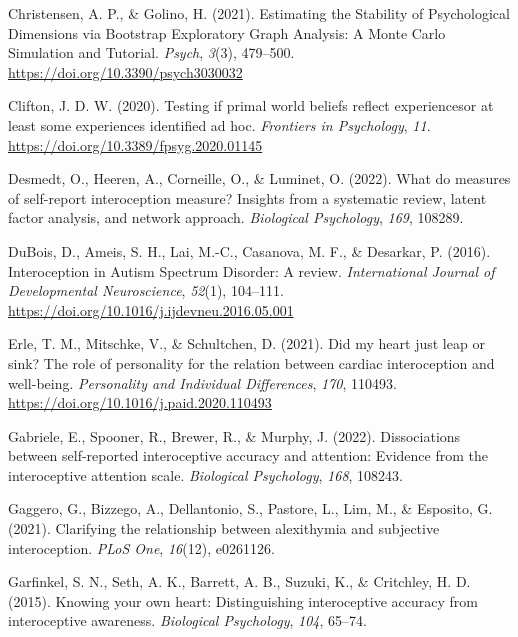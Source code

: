 \documentclass[
  man,
  floatsintext,
  longtable,
  nolmodern,
  notxfonts,
  notimes,
  colorlinks=true,linkcolor=blue,citecolor=blue,urlcolor=blue]{apa7}
\newlength{\cslhangindent}
\newenvironment{CSLReferences}[2] %
 {\begin{list}{}{%
  \setlength{\itemindent}{0pt}
  \setlength{\leftmargin}{0pt}
  \setlength{\parsep}{0pt}
  \ifodd #1
   \setlength{\leftmargin}{\cslhangindent}
   \setlength{\itemindent}{-1\cslhangindent}
  \fi
  \setlength{\itemsep}{#2\baselineskip}}}
 {\end{list}}
\begin{document}
\begin{CSLReferences}{1}{0}
Christensen, A. P., \& Golino, H. (2021). Estimating the Stability of
Psychological Dimensions via Bootstrap Exploratory Graph Analysis: A
Monte Carlo Simulation and Tutorial. \emph{Psych}, \emph{3}(3),
479--500. \url{https://doi.org/10.3390/psych3030032}

Clifton, J. D. W. (2020). Testing if primal world beliefs reflect
experiences{\textemdash}or at least some experiences identified ad hoc.
\emph{Frontiers in Psychology}, \emph{11}.
\url{https://doi.org/10.3389/fpsyg.2020.01145}

Desmedt, O., Heeren, A., Corneille, O., \& Luminet, O. (2022). What do
measures of self-report interoception measure? Insights from a
systematic review, latent factor analysis, and network approach.
\emph{Biological Psychology}, \emph{169}, 108289.

DuBois, D., Ameis, S. H., Lai, M.-C., Casanova, M. F., \& Desarkar, P.
(2016). Interoception in Autism Spectrum Disorder: A review.
\emph{International Journal of Developmental Neuroscience},
\emph{52}(1), 104--111.
\url{https://doi.org/10.1016/j.ijdevneu.2016.05.001}

Erle, T. M., Mitschke, V., \& Schultchen, D. (2021). Did my heart just
leap or sink? The role of personality for the relation between cardiac
interoception and well-being. \emph{Personality and Individual
Differences}, \emph{170}, 110493.
\url{https://doi.org/10.1016/j.paid.2020.110493}

Gabriele, E., Spooner, R., Brewer, R., \& Murphy, J. (2022).
Dissociations between self-reported interoceptive accuracy and
attention: Evidence from the interoceptive attention scale.
\emph{Biological Psychology}, \emph{168}, 108243.

Gaggero, G., Bizzego, A., Dellantonio, S., Pastore, L., Lim, M., \&
Esposito, G. (2021). Clarifying the relationship between alexithymia and
subjective interoception. \emph{PLoS One}, \emph{16}(12), e0261126.

Garfinkel, S. N., Seth, A. K., Barrett, A. B., Suzuki, K., \& Critchley,
H. D. (2015). Knowing your own heart: Distinguishing interoceptive
accuracy from interoceptive awareness. \emph{Biological Psychology},
\emph{104}, 65--74.


\end{CSLReferences}
\end{document}
